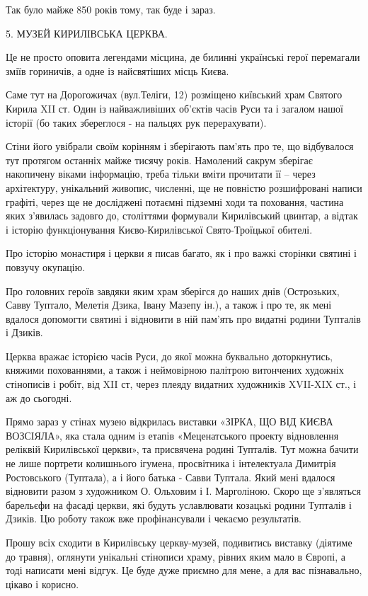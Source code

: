 Так було майже 850 років тому, так буде і зараз.

5. МУЗЕЙ КИРИЛІВСЬКА ЦЕРКВА.

Це не просто оповита легендами місцина, де билинні українські герої перемагали
зміїв гориничів, а одне із найсвятіших місць Києва.

Саме тут на Дорогожичах (вул.Теліги, 12) розміщено київський храм Святого
Кирила XII ст.  Один із найважливіших об’єктів часів Руси та і загалом нашої
історії (бо таких збереглося - на пальцях рук перерахувати).

Стіни його увібрали своїм корінням і зберігають пам’ять про те, що відбувалося
тут протягом останніх майже тисячу років. Намолений сакрум зберігає накопичену
віками інформацію, треба тільки вміти прочитати її – через архітектуру,
унікальний живопис, численні, ще не повністю розшифровані написи графіті, через
ще не досліджені потаємні підземні ходи та поховання, частина яких з'явилась
задовго до, століттями формували Кирилівський цвинтар, а відтак і історію
функціонування Києво-Кирилівської Свято-Троїцької обителі.

Про історію монастиря і церкви я писав багато, як і про важкі сторінки святині
і повзучу окупацію.

Про головних героїв завдяки яким храм зберігся до наших днів (Острозьких, Савву
Туптало, Мелетія Дзика, Івану Мазепу ін.), а також і про те, як мені вдалося
допомогти святині і відновити в ній пам’ять про видатні родини Тупталів і
Дзиків.

Церква вражає історією часів Руси, до якої можна буквально доторкнутись,
княжими похованнями, а також і неймовірною палітрою витончених художніх
стінописів і робіт, від XII ст, через плеяду видатних художників XVII-XIX ст.,
і аж до сьогодні.

Прямо зараз у стінах музею відкрилась виставки «ЗІРКА, ЩО ВІД КИЄВА ВОЗСІЯЛА»,
яка стала одним із етапів «Меценатського проекту відновлення реліквій
Кирилівської церкви», та присвячена родині Тупталів. Тут можна бачити не лише
портрети колишнього ігумена, просвітника і інтелектуала Димитрія Ростовського
(Туптала), а і його батька - Савви Туптала. Який мені вдалося відновити разом з
художником О. Ольховим і І. Марголіною. Скоро ще з’являться барельєфи на фасаді
церкви, які будуть уславлювати козацькі родини Тупталів і Дзиків. Цю роботу
також вже профінансували і чекаємо результатів.

Прошу всіх сходити в Кирилівську церкву-музей, подивитись виставку (діятиме до
травня), оглянути унікальні стінописи храму, рівних яким мало в Європі, а тоді
написати мені відгук. Це буде дуже приємно для мене, а для вас пізнавально,
цікаво і корисно.


